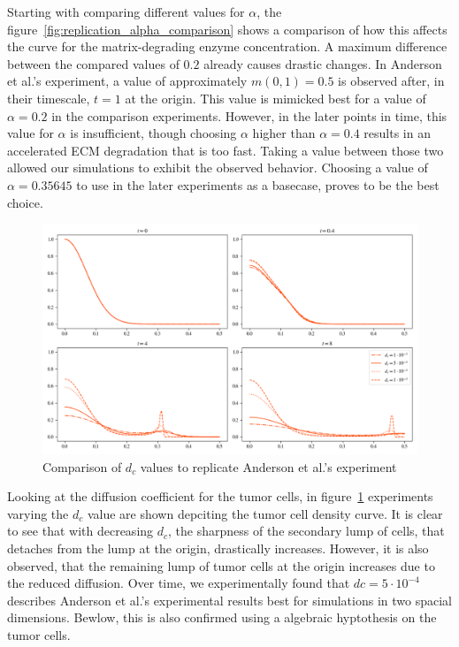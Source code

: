 Starting with comparing different values for $\alpha$, the figure~\ref{fig:replication_alpha_comparison} shows a comparison of how this affects the curve for the matrix-degrading enzyme concentration. A maximum difference between the compared values of $0.2$ already causes drastic changes. In Anderson et al.'s experiment, a value of approximately $m(0,1)=0.5$ is observed after, in their timescale, $t=1$ at the origin. This value is mimicked best for a value of $\alpha=0.2$ in the comparison experiments. However, in the later points in time, this value for $\alpha$ is insufficient, though choosing $\alpha$ higher than $\alpha=0.4$ results in an accelerated ECM degradation that is too fast. Taking a value between those two allowed our simulations to exhibit the observed behavior. Choosing a value of $\alpha=0.35645$ to use in the later experiments as a basecase, proves to be the best choice.

\begin{figure}[!htb]
 \centering
 \includegraphics[width=\textwidth]{resources/images/dc_comparison.png}
 \caption{Comparison of $d_c$ values to replicate Anderson et al.'s experiment}
 \label{fig:replication_dc_comparison}
\end{figure}

Looking at the diffusion coefficient for the tumor cells, in figure~\ref{fig:replication_dc_comparison} experiments varying the $d_c$ value are shown depciting the tumor cell density curve. It is clear to see that with decreasing $d_c$, the sharpness of the secondary lump of cells, that detaches from the lump at the origin, drastically increases. However, it is also observed, that the remaining lump of tumor cells at the origin increases due to the reduced diffusion. Over time, we experimentally found that $dc=5 \cdot 10^{-4}$ describes Anderson et al.'s experimental results best for simulations in two spacial dimensions. Bewlow, this is also confirmed using a algebraic hyptothesis on the tumor cells.

